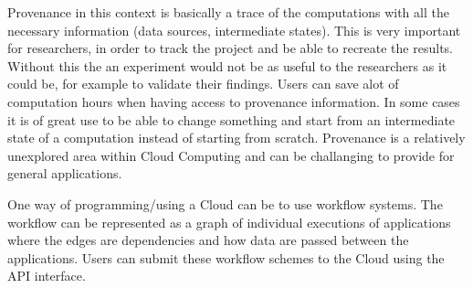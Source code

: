 

Provenance in this context is basically a trace of the computations
with all the necessary information (data sources, intermediate
states). This is very important for researchers, in order to track the
project and be able to recreate the results. Without this the an
experiment would not be as useful to the researchers as it could be,
for example to validate their findings. Users can save alot of
computation hours when having access to provenance information. In
some cases it is of great use to be able to change something and start
from an intermediate state of a computation instead of starting from
scratch. Provenance is a relatively unexplored area within Cloud
Computing and can be challanging to provide for general applications.




One way of programming/using a Cloud can be to use workflow
systems. The workflow can be represented as a graph of individual
executions of applications where the edges are dependencies and how
data are passed between the applications. Users can submit these
workflow schemes to the Cloud using the API interface.





